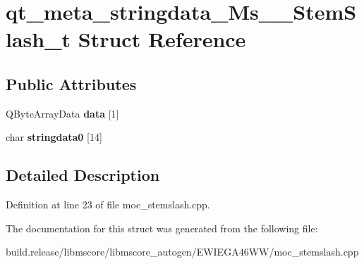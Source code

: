 \hypertarget{structqt__meta__stringdata___ms_____stem_slash__t}{}\section{qt\+\_\+meta\+\_\+stringdata\+\_\+\+Ms\+\_\+\+\_\+\+Stem\+Slash\+\_\+t Struct Reference}
\label{structqt__meta__stringdata___ms_____stem_slash__t}
\subsection*{Public Attributes}
\begin{DoxyCompactItemize}
\item 
\mbox{\label{structqt__meta__stringdata___ms_____stem_slash__t_a1c7c6e6b9e74458086b749c7ea22b1e7}} 
Q\+Byte\+Array\+Data {\bfseries data} \mbox{[}1\mbox{]}
\item 
\mbox{\label{structqt__meta__stringdata___ms_____stem_slash__t_a5adaca9140052aa8cbb6cef7d98cb399}} 
char {\bfseries stringdata0} \mbox{[}14\mbox{]}
\end{DoxyCompactItemize}


\subsection{Detailed Description}


Definition at line 23 of file moc\+\_\+stemslash.\+cpp.



The documentation for this struct was generated from the following file\+:\begin{DoxyCompactItemize}
\item 
build.\+release/libmscore/libmscore\+\_\+autogen/\+E\+W\+I\+E\+G\+A46\+W\+W/moc\+\_\+stemslash.\+cpp\end{DoxyCompactItemize}
